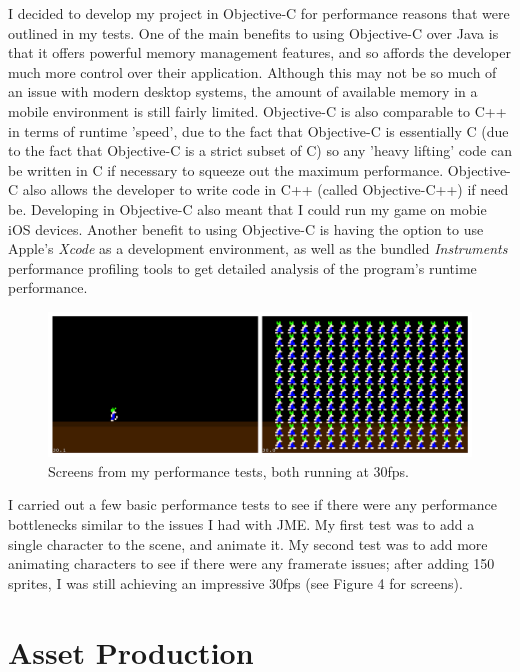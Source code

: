\documentclass[a4paper,oneside]{report}
\begin{document}
I decided to develop my project in Objective-C for performance reasons that were outlined in my tests. One of the main benefits to using Objective-C over Java is that it offers powerful memory management features, and so affords the developer much more control over their application. Although this may not be so much of an issue with modern desktop systems, the amount of available memory in a mobile environment is still fairly limited. Objective-C is also comparable to C++ in terms of runtime 'speed', due to the fact that Objective-C is essentially C (due to the fact that Objective-C is a strict subset of C) so any 'heavy lifting' code can be written in C if necessary to squeeze out the maximum performance. Objective-C also allows the developer to write code in C++ (called Objective-C++) if need be. Developing in Objective-C also meant that I could run my game on mobie iOS devices. Another benefit to using Objective-C is having the option to use Apple's \emph{Xcode} as a development environment, as well as the bundled \emph{Instruments} performance profiling tools to get detailed analysis of the program's runtime performance.

\begin{figure}[h!]
  \centering
    \includegraphics[width=140mm]{sources/images/InitialTests}
    \caption{Screens from my performance tests, both running at 30fps.}
\end{figure}

I carried out a few basic performance tests to see if there were any performance bottlenecks similar to the issues I had with JME. My first test was to add a single character to the scene, and animate it. My second test was to add more animating characters to see if there were any framerate issues; after adding 150 sprites, I was still achieving an impressive 30fps (see Figure 4 for screens). 

\section{Asset Production}
\end{document}
